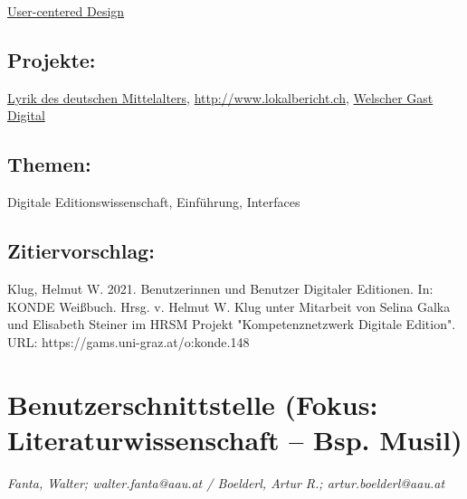 \documentclass{article}
\begin{document}
\href{https://gams.uni-graz.at/o:konde.207}{User-centered Design}\subsection*{Projekte:}\href{http://www.ldm-digital.de}{Lyrik des deutschen Mittelalters}, \href{http://www.lokalbericht.ch}{http://www.lokalbericht.ch}, \href{http://digi.ub.uni-heidelberg.de/wgd/}{Welscher Gast Digital}\subsection*{Themen:}Digitale Editionswissenschaft, Einführung, Interfaces\subsection*{Zitiervorschlag:}Klug, Helmut W. 2021. Benutzerinnen und Benutzer Digitaler Editionen. In: KONDE Weißbuch. Hrsg. v. Helmut W. Klug unter Mitarbeit von Selina Galka und Elisabeth Steiner im HRSM Projekt "Kompetenznetzwerk Digitale Edition". URL: https://gams.uni-graz.at/o:konde.148\newpage\section*{Benutzerschnittstelle (Fokus: Literaturwissenschaft – Bsp. Musil)} \emph{Fanta, Walter; walter.fanta@aau.at / Boelderl, Artur R.;
                  artur.boelderl@aau.at}\\
        
\end{document}
